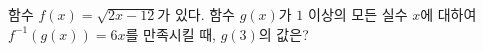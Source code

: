 함수 $f(x)=\sqrt{2x-12}$가 있다. 함수 $g(x)$가 $1$ 이상의 모든 실수 $x$에 대하여 $f^{-1}(g(x))=6x$를 만족시킬 때, $g(3)$의 값은?
